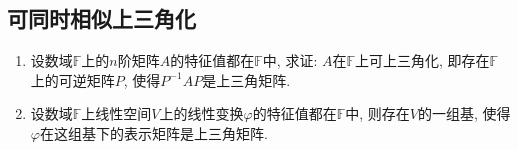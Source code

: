 \documentclass[../../main.tex]{subfiles}
\begin{document}
\subsection{可同时相似上三角化}

\begin{proposition}[矩阵的上三角化]\label{proposition:特征值全在同一数域的矩阵可上三角化}
\begin{enumerate}
\item 设数域\(\mathbb{F}\)上的\(n\)阶矩阵\(A\)的特征值都在\(\mathbb{F}\)中, 求证: \(A\)在\(\mathbb{F}\)上可上三角化, 即存在\(\mathbb{F}\)上的可逆矩阵\(P\), 使得\(P^{-1}AP\)是上三角矩阵.
\item 设数域\(\mathbb{F}\)上线性空间\(V\)上的线性变换\(\varphi\)的特征值都在\(\mathbb{F}\)中, 则存在\(V\)的一组基, 使得\(\varphi\)在这组基下的表示矩阵是上三角矩阵. 
\end{enumerate}
\end{proposition}
\end{document}
